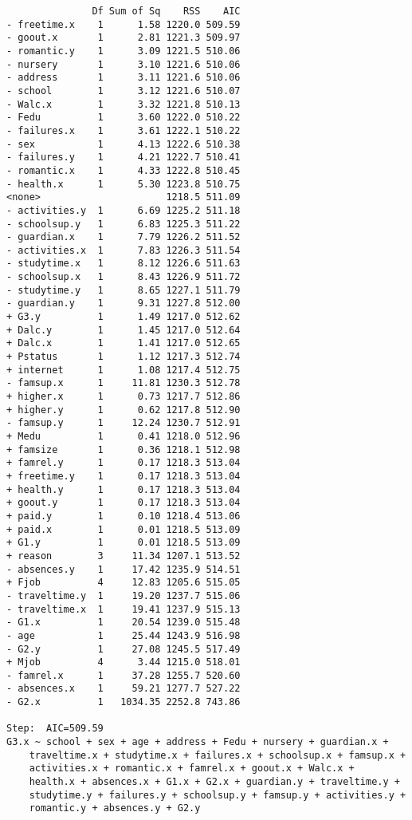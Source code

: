\documentclass[11pt]{article}
\begin{document}
\begin{enumerate}
\begin{verbatim}
               Df Sum of Sq    RSS    AIC
- freetime.x    1      1.58 1220.0 509.59
- goout.x       1      2.81 1221.3 509.97
- romantic.y    1      3.09 1221.5 510.06
- nursery       1      3.10 1221.6 510.06
- address       1      3.11 1221.6 510.06
- school        1      3.12 1221.6 510.07
- Walc.x        1      3.32 1221.8 510.13
- Fedu          1      3.60 1222.0 510.22
- failures.x    1      3.61 1222.1 510.22
- sex           1      4.13 1222.6 510.38
- failures.y    1      4.21 1222.7 510.41
- romantic.x    1      4.33 1222.8 510.45
- health.x      1      5.30 1223.8 510.75
<none>                      1218.5 511.09
- activities.y  1      6.69 1225.2 511.18
- schoolsup.y   1      6.83 1225.3 511.22
- guardian.x    1      7.79 1226.2 511.52
- activities.x  1      7.83 1226.3 511.54
- studytime.x   1      8.12 1226.6 511.63
- schoolsup.x   1      8.43 1226.9 511.72
- studytime.y   1      8.65 1227.1 511.79
- guardian.y    1      9.31 1227.8 512.00
+ G3.y          1      1.49 1217.0 512.62
+ Dalc.y        1      1.45 1217.0 512.64
+ Dalc.x        1      1.41 1217.0 512.65
+ Pstatus       1      1.12 1217.3 512.74
+ internet      1      1.08 1217.4 512.75
- famsup.x      1     11.81 1230.3 512.78
+ higher.x      1      0.73 1217.7 512.86
+ higher.y      1      0.62 1217.8 512.90
- famsup.y      1     12.24 1230.7 512.91
+ Medu          1      0.41 1218.0 512.96
+ famsize       1      0.36 1218.1 512.98
+ famrel.y      1      0.17 1218.3 513.04
+ freetime.y    1      0.17 1218.3 513.04
+ health.y      1      0.17 1218.3 513.04
+ goout.y       1      0.17 1218.3 513.04
+ paid.y        1      0.10 1218.4 513.06
+ paid.x        1      0.01 1218.5 513.09
+ G1.y          1      0.01 1218.5 513.09
+ reason        3     11.34 1207.1 513.52
- absences.y    1     17.42 1235.9 514.51
+ Fjob          4     12.83 1205.6 515.05
- traveltime.y  1     19.20 1237.7 515.06
- traveltime.x  1     19.41 1237.9 515.13
- G1.x          1     20.54 1239.0 515.48
- age           1     25.44 1243.9 516.98
- G2.y          1     27.08 1245.5 517.49
+ Mjob          4      3.44 1215.0 518.01
- famrel.x      1     37.28 1255.7 520.60
- absences.x    1     59.21 1277.7 527.22
- G2.x          1   1034.35 2252.8 743.86

Step:  AIC=509.59
G3.x ~ school + sex + age + address + Fedu + nursery + guardian.x + 
    traveltime.x + studytime.x + failures.x + schoolsup.x + famsup.x + 
    activities.x + romantic.x + famrel.x + goout.x + Walc.x + 
    health.x + absences.x + G1.x + G2.x + guardian.y + traveltime.y + 
    studytime.y + failures.y + schoolsup.y + famsup.y + activities.y + 
    romantic.y + absences.y + G2.y


\end{verbatim}
\end{enumerate}
\end{document}
